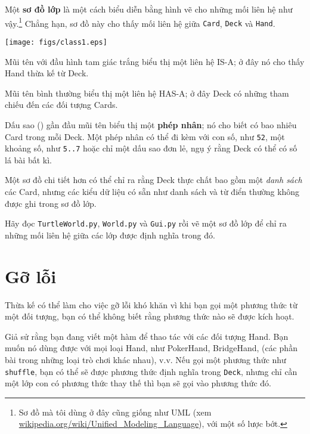 \documentclass[11pt]{book}
\begin{document}

Một {\bf sơ đồ lớp} là một cách biểu diễn bằng hình vẽ cho những mối liên hệ
như vậy.\footnote{Sơ đồ mà tôi dùng ở đây cũng giống như UML
  (xem \url{wikipedia.org/wiki/Unified_Modeling_Language}), với một số
  lược bớt.} Chẳng hạn, sơ đồ này cho thấy mối liên hệ
  giữa {\tt Card}, {\tt Deck} và {\tt Hand}.

\beforefig
\centerline{\texttt{[image: figs/class1.eps]}}
\afterfig

Mũi tên với đầu hình tam giác trắng biểu thị một liên hệ IS-A; 
ở đây nó cho thấy Hand thừa kế từ Deck.

Mũi tên bình thường biểu thị một liên hệ HAS-A; 
ở đây Deck có những tham chiếu đến các đối tượng Cards.


Dấu sao ({\tt *}) gần đầu mũi tên biểu thị một
{\bf phép nhân}; nó cho biết có bao nhiêu Card trong mỗi Deck. 
Một phép nhân có thể đi kèm với con số, như {\tt 52}, một khoảng số,
như {\tt 5..7} hoặc chỉ một dấu sao đơn lẻ, ngụ ý rằng Deck có thể
có số lá bài bất kì.

Một sơ đồ chi tiết hơn có thể chỉ ra rằng Deck thực chất
bao gồm một {\em danh sách} các Card, nhưng các kiểu dữ liệu có sẵn
như danh sách và từ điển thường không được ghi trong sơ đồ lớp.

\begin{ex}
Hãy đọc {\tt TurtleWorld.py}, {\tt World.py} và {\tt Gui.py}
rồi vẽ một sơ đồ lớp để chỉ ra những mối liên hệ giữa 
các lớp được định nghĩa trong đó.
\end{ex}


\section{Gỡ lỗi}

Thừa kế có thể làm cho việc gỡ lỗi khó khăn vì khi bạn gọi
một phương thức từ một đối tượng, bạn có thể không biết rằng 
phương thức nào sẽ được kích hoạt.


Giả sử rằng bạn đang viết một hàm để thao tác với các đối tượng Hand.
Bạn muốn nó dùng được với mọi loại Hand, như 
PokerHand, BridgeHand, (các phần bài trong những loại trò chơi
khác nhau), v.v. Nếu gọi một phương thức như
{\tt shuffle}, bạn có thể sẽ được phương thức định nghĩa trong {\tt Deck},
nhưng chỉ cần một lớp con có phương thức thay thế thì bạn
sẽ gọi vào phương thức đó.
\end{document}
